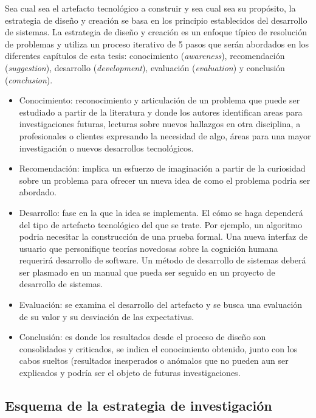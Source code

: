 Sea cual sea el artefacto tecnológico a construir y sea cual sea su propósito, la estrategia de diseño y creación se basa en los principio establecidos del desarrollo de sistemas. La estrategia de diseño y creación es un enfoque típico de resolución de problemas y utiliza un proceso iterativo de 5 pasos que serán abordados en los diferentes capítulos de esta tesis: conocimiento (\emph{awareness}), recomendación (\emph{suggestion}), desarrollo (\emph{development}), evaluación (\emph{evaluation}) y conclusión (\emph{conclusion}).

\begin{itemize}
\item Conocimiento: reconocimiento y articulación de un problema que puede ser estudiado a partir de la literatura y donde los autores identifican areas para investigaciones futuras, lecturas sobre nuevos hallazgos en otra disciplina, a profesionales o clientes expresando la necesidad de algo, áreas para una mayor investigación o nuevos desarrollos tecnológicos.
\item Recomendación: implica un esfuerzo de imaginación a partir de la curiosidad sobre un problema para ofrecer un nueva idea de como el problema podria ser abordado.
\item Desarrollo: fase en la que la idea se implementa. El cómo se haga dependerá del tipo de artefacto tecnológico del que se trate. Por ejemplo, un algoritmo podria necesitar la construcción de una prueba formal. Una nueva interfaz de usuario que personifique teorías novedosas sobre la cognición humana requerirá desarrollo de software. Un método de desarrollo de sistemas deberá ser plasmado en un manual que pueda ser seguido en un proyecto de desarrollo de sistemas.
\item Evaluación: se examina el desarrollo del artefacto y se busca una evaluación de su valor y su desviación de las expectativas.
\item Conclusión: es donde los resultados desde el proceso de diseño son consolidados y criticados, se indica el conocimiento obtenido, junto con los cabos sueltos (resultados inesperados o anómalos que no pueden aun ser explicados y podría ser el objeto de futuras investigaciones.
\end{itemize}



\subsection{Esquema de la estrategia de investigación}

